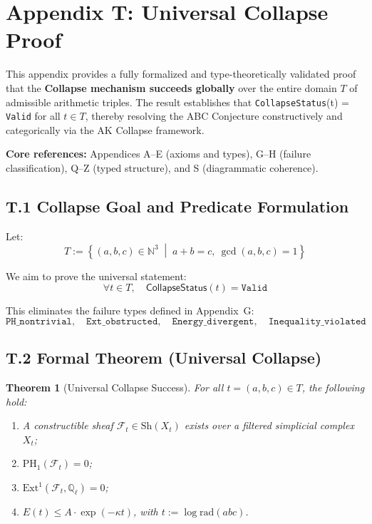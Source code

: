 \documentclass[11pt]{article}
\newtheorem{theorem}{Theorem}[section]
\begin{document}
\section*{Appendix T: Universal Collapse Proof}

This appendix provides a fully formalized and type-theoretically validated proof that the \textbf{Collapse mechanism succeeds globally}  
over the entire domain \( T \) of admissible arithmetic triples. The result establishes that \texttt{CollapseStatus}(t) = \texttt{Valid} for all \( t \in T \),  
thereby resolving the ABC Conjecture constructively and categorically via the AK Collapse framework.

\vspace{1em}
\noindent
\textbf{Core references:} Appendices A–E (axioms and types), G–H (failure classification), Q–Z (typed structure), and S (diagrammatic coherence).

\subsection*{T.1 Collapse Goal and Predicate Formulation}

Let:
\[
T := \left\{ (a,b,c) \in \mathbb{N}^3 \;\middle|\; a + b = c,\ \gcd(a,b,c) = 1 \right\}
\]

We aim to prove the universal statement:
\[
\boxed{
\forall t \in T, \quad \mathsf{CollapseStatus}(t) = \texttt{Valid}
}
\]

This eliminates the failure types defined in Appendix~G:
\[
\texttt{PH\_nontrivial},\quad \texttt{Ext\_obstructed},\quad \texttt{Energy\_divergent},\quad \texttt{Inequality\_violated}
\]

\subsection*{T.2 Formal Theorem (Universal Collapse)}

\begin{theorem}[Universal Collapse Success]
For all \( t = (a,b,c) \in T \), the following hold:
\begin{enumerate}
  \item A constructible sheaf \( \mathcal{F}_t \in \mathrm{Sh}(X_t) \) exists over a filtered simplicial complex \( X_t \);
  \item \( \mathrm{PH}_1(\mathcal{F}_t) = 0 \);
  \item \( \mathrm{Ext}^1(\mathcal{F}_t, \mathbb{Q}_\ell) = 0 \);
  \item \( E(t) \leq A \cdot \exp(-\kappa t) \), with \( t := \log \mathrm{rad}(abc) \).
\end{enumerate}
\end{theorem}
\end{document}
